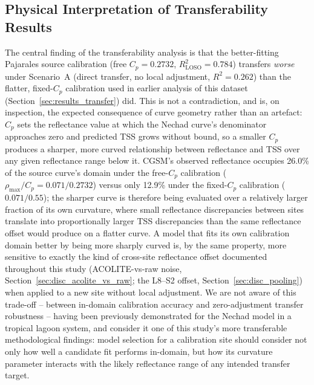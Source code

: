 \documentclass[remotesensing,article,submit,pdftex,moreauthors]{Definitions/mdpi}
\begin{document}
 
\subsection{Physical Interpretation of Transferability Results}
\label{sec:disc_transfer}
 
The central finding of the transferability analysis is that the
better-fitting Pajarales source calibration (free $C_p = 0.2732$,
$R^2_{\text{LOSO}} = 0.784$) transfers \emph{worse} under Scenario~A
(direct transfer, no local adjustment, $R^2 = 0.262$) than the
flatter, fixed-$C_p$ calibration used in earlier analysis of this
dataset (Section~\ref{sec:results_transfer}) did. This is not a
contradiction, and is, on inspection, the expected consequence of
curve geometry rather than an artefact: $C_p$ sets the reflectance
value at which the Nechad curve's denominator approaches zero and
predicted TSS grows without bound, so a smaller $C_p$ produces a
sharper, more curved relationship between reflectance and TSS over any
given reflectance range below it. CGSM's observed reflectance occupies
26.0\% of the source curve's domain under the free-$C_p$ calibration
($\rho_{\max}/C_p = 0.071/0.2732$) versus only 12.9\% under the
fixed-$C_p$ calibration ($0.071/0.55$); the sharper curve is therefore
being evaluated over a relatively larger fraction of its own
curvature, where small reflectance discrepancies between sites
translate into proportionally larger TSS discrepancies than the same
reflectance offset would produce on a flatter curve. A model that fits
its own calibration domain better by being more sharply curved is, by
the same property, more sensitive to exactly the kind of cross-site
reflectance offset documented throughout this study (ACOLITE-vs-raw
noise, Section~\ref{sec:disc_acolite_vs_raw}; the L8--S2 offset,
Section~\ref{sec:disc_pooling}) when applied to a new site without
local adjustment. We are not aware of this trade-off -- between
in-domain calibration accuracy and zero-adjustment transfer
robustness -- having been previously demonstrated for the Nechad model
in a tropical lagoon system, and consider it one of this study's more
transferable methodological findings: model selection for a
calibration site should consider not only how well a candidate fit
performs in-domain, but how its curvature parameter interacts with the
likely reflectance range of any intended transfer target.
\end{document}
